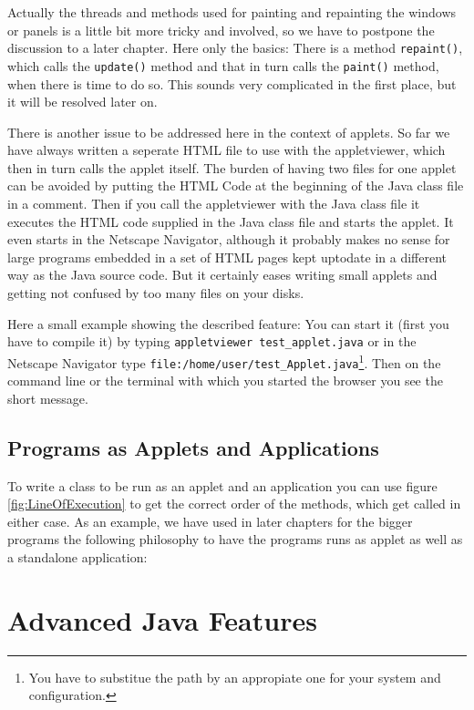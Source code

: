 Actually the threads and methods used for painting and repainting
the windows or panels is a little bit more tricky and involved, so we
have to postpone the discussion to a later chapter. Here only the basics:
There is a method \verb|repaint()|, which calls the \verb|update()|
method and that in turn calls the \verb|paint()| method, when there is time
to do so. This sounds very complicated in the first place, but 
it will be resolved later on.

There is another issue to be addressed here in the context of applets.
So far we have always written a seperate HTML file to use with the
appletviewer, which then in turn calls the applet itself. The burden
of having two files for one applet can be avoided by putting the
HTML Code at the beginning of the Java class file in a comment. Then
if you call the appletviewer with the Java class file 
it executes the HTML code supplied
in the Java class file and starts the applet. It even starts in
the Netscape Navigator, although it probably makes no sense for
large programs embedded in a set of HTML pages kept uptodate in a
different way as the Java source code. But it certainly eases
writing small applets and getting not confused by too many files on
your disks. 

Here a small example showing the described feature:
You can start it (first you have to compile it) 
by typing \verb|appletviewer test_applet.java| or 
in the Netscape Navigator type 
\verb|file:/home/user/test_Applet.java|\footnote{You have to substitue the path 
  by an appropiate one for your system and configuration.}.
Then on the command line or the terminal with which you started the browser  
you see the short message.


\subsection{Programs as Applets and Applications}
To write a class to be run as an applet and an application
you can use figure \ref{fig:LineOfExecution} to get the correct order
of the methods, which get called in either case. As an example, we have used
in later chapters for the bigger programs the following philosophy
to have the programs runs as applet as well as a standalone application:

\section{Advanced Java Features}

